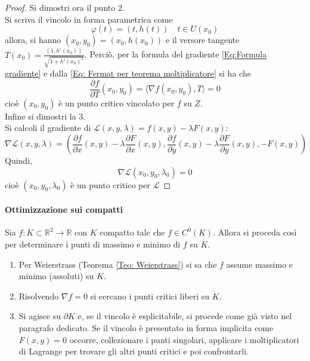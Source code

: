 \begin{proof}
    Si dimostri ora il punto 2.\\
    Si scriva il vincolo in forma parametrica come
    \begin{equation*}
        \varphi(t)=(t, h(t)) \quad t \in U(x_0)
    \end{equation*}
    allora, si hanno $(x_0, y_0)=(x_0, h(x_0))$ e il versore tangente $T(x_0)=\tfrac{(1, h'(x_0))}{\sqrt{1+h'(x_0)^2}}$.
    Perciò, per la formula del gradiente \eqref{Eq:Formula gradiente}
    e dalla \eqref{Eq: Fermat per teorema moltiplicatore}
    si ha che
    \begin{equation*}
        \frac{\partial{f}}{\partial{T}}(x_0, y_0)= \langle \nabla f(x_0, y_0), T\rangle = 0
    \end{equation*}
    cioè $(x_0, y_0)$ è un punto critico vincolato per $f$ su $Z$.\\
    Infine si dimostri la 3.\\
    Si calcoli il gradiente di $\mathcal{L}(x, y, \lambda)=f(x, y)-\lambda F(x, y)$:
    \begin{equation*}
        \nabla \mathcal{L}(x,y,\lambda)=\left(\frac{\partial{f}}{\partial{x}}(x, y)-\lambda \frac{\partial{F}}{\partial{x}}(x, y), \frac{\partial{f}}{\partial{y}}(x, y)-\lambda \frac{\partial{F}}{\partial{y}}(x, y), -F(x, y)\right)
    \end{equation*}
    Quindi,
    \begin{equation*}
     \nabla \mathcal{L}(x_0, y_0, \lambda_0)=0   
    \end{equation*}
    cioè $(x_0, y_0, \lambda_0)$ è un punto critico per $\mathcal{L}$
\end{proof}
\paragraph{Ottimizzazione sui compatti}
Sia $f: K \subset \mathbb{R}^2 \to \mathbb{R}$ con $K$ compatto tale che $f \in C^0(K)$. Allora si proceda così per determinare i punti di massimo e minimo di $f$ su $K$.
\begin{enumerate}
    \item Per Weierstrass (Teorema \ref{Teo: Weierstrass}) si sa che $f$ assume massimo e minimo (assoluti) su $K$.
    \item Risolvendo $\nabla f=0$ si cercano i punti critici liberi su $\mathring{K}$.
    \item Si agisce su $\partial K$ e, se il vincolo è esplicitabile, si procede come già visto nel paragrafo dedicato. Se il vincolo è presentato in forma implicita come $F(x,y)=0$ occorre, collezionare i punti singolari, applicare i moltiplicatori di Lagrange per trovare gli altri punti critici e poi confrontarli.
\end{enumerate}